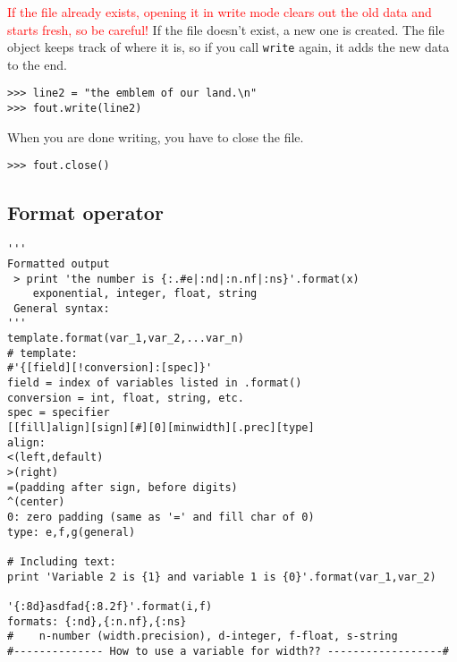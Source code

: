 \documentclass{article}
\begin{document}
\begin{multicols}{2}
\par \textcolor{red}{If the file already exists, opening it in
write mode clears out the
old data and starts fresh, so be careful!} If the file doesn't
exist, a new one is created.
The file object keeps track of where it is, so if you call
\verb|write| again, it adds the new data to the end.

\begin{lstlisting}
>>> line2 = "the emblem of our land.\n"
>>> fout.write(line2)
\end{lstlisting}

\par When you are done writing, you have to close the file.

\begin{lstlisting}
>>> fout.close()
\end{lstlisting}

\subsection{Format operator}

\begin{lstlisting}
'''
Formatted output
 > print 'the number is {:.#e|:nd|:n.nf|:ns}'.format(x)
    exponential, integer, float, string
 General syntax:
'''
template.format(var_1,var_2,...var_n)
# template:
#'{[field][!conversion]:[spec]}'
field = index of variables listed in .format()
conversion = int, float, string, etc.
spec = specifier
[[fill]align][sign][#][0][minwidth][.prec][type]
align:
<(left,default)
>(right)
=(padding after sign, before digits)
^(center)
0: zero padding (same as '=' and fill char of 0)
type: e,f,g(general)

# Including text:
print 'Variable 2 is {1} and variable 1 is {0}'.format(var_1,var_2)

'{:8d}asdfad{:8.2f}'.format(i,f)
formats: {:nd},{:n.nf},{:ns}
#    n-number (width.precision), d-integer, f-float, s-string
#-------------- How to use a variable for width?? ------------------#
\end{lstlisting}


\end{multicols}
\end{document}
